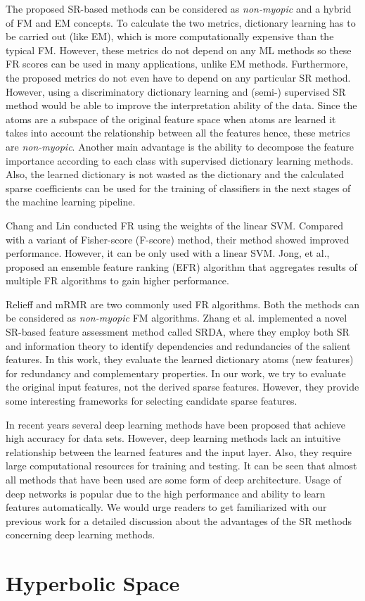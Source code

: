 The proposed SR-based methods can be considered as \textit{non-myopic} and a hybrid of FM and EM concepts. To calculate the two metrics, dictionary learning has to be carried out (like EM), which is more computationally expensive than the typical FM\@. However, these metrics do not depend on any ML methods so these FR scores can be used in many applications, unlike EM methods. Furthermore, the proposed metrics do not even have to depend on any particular SR method. However, using a discriminatory dictionary learning and (semi-) supervised SR method would be able to improve the interpretation ability of the data. Since the atoms are a subspace of the original feature space when atoms are learned it takes into account the relationship between all the features hence, these metrics are \textit{non-myopic}. Another main advantage is the ability to decompose the feature importance according to each class with supervised dictionary learning methods. Also, the learned dictionary is not wasted as the dictionary and the calculated sparse coefficients can be used for the training of classifiers in the next stages of the machine learning pipeline. 

Chang and Lin\cite{Chang2008} conducted FR using the weights of the linear SVM\@. Compared with a variant of Fisher-score\cite{Chang2011} (F-score) method, their method showed improved performance. However, it can be only used with a linear SVM\@. Jong, et al.\cite{Jong2004}, proposed an ensemble feature ranking (EFR) algorithm that aggregates results of multiple FR algorithms to gain higher performance. 

Relieff\cite{Kononenko1997} and mRMR\cite{Ding2005} are two commonly used FR algorithms. Both the methods can be considered as \textit{non-myopic} FM algorithms. Zhang et al.\cite{Zhang2019} implemented a novel SR-based feature assessment method called SRDA, where they employ both SR and information theory to identify dependencies and redundancies of the salient features. In this work, they evaluate the learned dictionary atoms (new features) for redundancy and complementary properties. In our work, we try to evaluate the original input features, not the derived sparse features. However, they provide some interesting frameworks for selecting candidate sparse features.

In recent years several deep learning methods have been proposed that achieve high accuracy for data sets. However, deep learning methods lack an intuitive relationship between the learned features and the input layer. Also, they require large computational resources for training and testing. It can be seen that almost all methods that have been used are some form of deep architecture. Usage of deep networks is popular due to the high performance and ability to learn features automatically\cite{Li2019}. We would urge readers to get familiarized with our previous work\cite{Liyanage2020} for a detailed discussion about the advantages of the SR methods concerning deep learning methods.

\section{Hyperbolic Space}